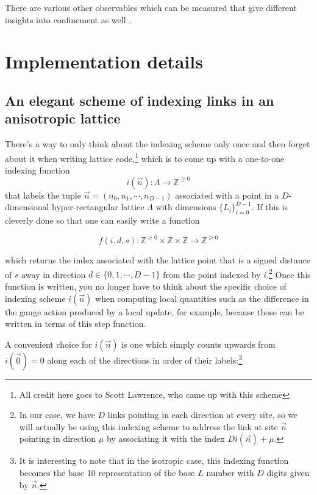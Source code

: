 \documentclass[11pt]{article}
\begin{document}
There are various other observables which can be measured that give different insights into confinement as well \cite{greensite2003confinement}.

\pagebreak


\appendix

\section{Implementation details}

\label{sec:details}

\subsection{An elegant scheme of indexing links in an anisotropic lattice}

\label{sec:indexing}

There’s a way to only think about the indexing scheme only once and then forget about it when writing lattice code,\footnote{All credit here goes to Scott Lawrence, who came up with this scheme} which is to come up with a one-to-one indexing function 
\begin{equation}i(\vec n):\Lambda\to\mathbb Z^{\geq 0}\end{equation}
 that labels the tuple $\vec n=(n_0,n_1,\cdots,n_{D-1})$ associated with a point in a $D$-dimensional hyper-rectangular lattice $\Lambda$ with dimensions $\{L_i\}_{i=0}^{D-1}$. If this is cleverly done so that one can easily write a function 
 
\begin{equation}f(i,d,s):\mathbb Z^{\geq 0}\times\mathbb Z\times \mathbb Z\to \mathbb Z^{\geq 0}\end{equation}
  
which returns the index associated with the lattice point that is a signed distance of $s$ away in direction $d\in\{0,1,\cdots,D-1\}$ from the point indexed by $i$.\footnote{In our case, we have $D$ links pointing in each direction at every site, so we will actually be using this indexing scheme to address the link at site $\vec n$ pointing in direction $\mu$ by associating it with the index $Di(\vec n)+\mu$.} Once this function is written, you no longer have to think about the specific choice of indexing scheme $i(\vec n)$ when computing local quantities such as the difference in the gauge action produced by a local update, for example, because those can be written in terms of this step function. 

A convenient choice for $i(\vec n)$ is one which simply counts upwards from $i(\vec 0)=0$ along each of the directions in order of their labels:\footnote{It is interesting to note that in the isotropic case, this indexing function becomes the base 10 representation of the base $L$ number with $D$ digits given by $\vec n$.}
\end{document}
